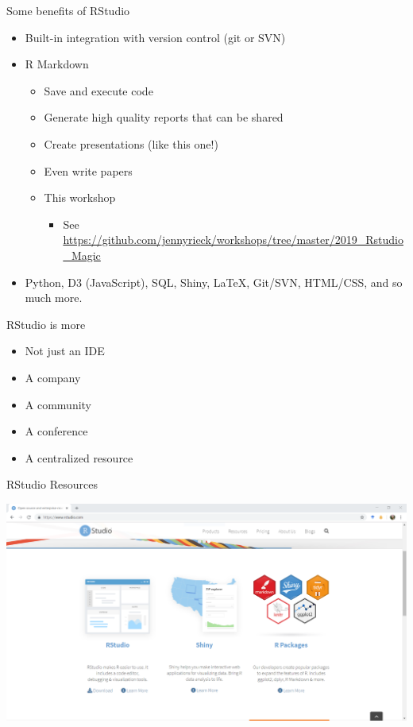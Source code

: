 \documentclass[
  ignorenonframetext,
]{beamer}
\providecommand{\tightlist}{%
  \setlength{\itemsep}{0pt}\setlength{\parskip}{0pt}}
\begin{document}
\begin{frame}{Some benefits of RStudio}
\protect\hypertarget{some-benefits-of-rstudio}{}

\begin{itemize}
\tightlist
\item
  Built-in integration with version control (git or SVN)
\item
  R Markdown

  \begin{itemize}
  \tightlist
  \item
    Save and execute code
  \item
    Generate high quality reports that can be shared
  \item
    Create presentations (like this one!)
  \item
    Even write papers
  \item
    This workshop

    \begin{itemize}
    \tightlist
    \item
      See
      \url{https://github.com/jennyrieck/workshops/tree/master/2019_Rstudio_Magic}
    \end{itemize}
  \end{itemize}
\item
  Python, D3 (JavaScript), SQL, Shiny, LaTeX, Git/SVN, HTML/CSS, and so
  much more.
\end{itemize}

\end{frame}

\begin{frame}{RStudio is more}
\protect\hypertarget{rstudio-is-more}{}

\begin{itemize}
\tightlist
\item
  Not just an IDE
\item
  A company
\item
  A community
\item
  A conference
\item
  A centralized resource
\end{itemize}

\end{frame}

\begin{frame}{RStudio Resources}
\protect\hypertarget{rstudio-resources}{}

\includegraphics{../external/images/rstudio_dot_com_1_main.PNG}

\end{frame}
\end{document}
